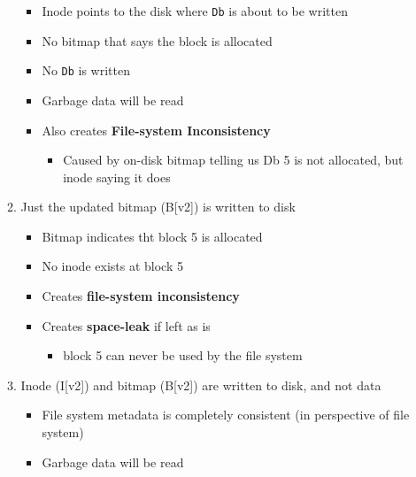 \documentclass[12pt]{article}
\begin{document}
\begin{itemize}
\begin{enumerate}[1)]
        \begin{itemize}
            \item Inode points to the disk where \texttt{Db} is about to be written
            \item No bitmap that says the block is allocated
            \item No \texttt{Db} is written
            \item Garbage data will be read
            \item Also creates \textbf{File-system Inconsistency}

            \begin{itemize}
                \item Caused by on-disk bitmap telling us Db 5 is not allocated,
                but inode saying it does
            \end{itemize}
        \end{itemize}

        \bigskip

        \item Just the updated bitmap (B[v2]) is written to disk

        \bigskip

        \begin{itemize}
            \item Bitmap indicates tht block 5 is allocated
            \item No inode exists at block 5
            \item Creates \textbf{file-system inconsistency}
            \item Creates \textbf{space-leak} if left as is

            \begin{itemize}
                \item block 5 can never be used by the file system
            \end{itemize}
        \end{itemize}

        \bigskip

        \item Inode (I[v2]) and bitmap (B[v2]) are written to disk, and not data

        \bigskip

        \begin{itemize}
            \item File system metadata is completely consistent (in perspective of file system)
            \item Garbage data will be read
        \end{itemize}


\end{enumerate}
\end{itemize}
\end{document}
